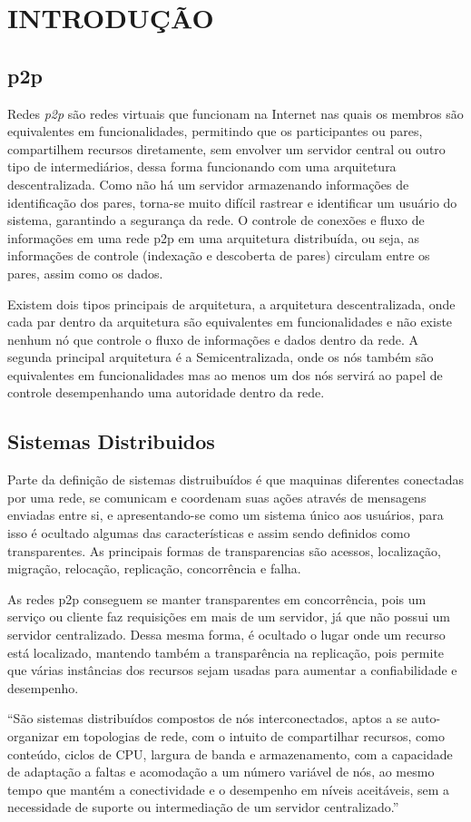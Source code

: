 \chapter{INTRODUÇÃO}
\label{cap:01}
\section{\ac{p2p}}
 
Redes \textit{\ac{p2p}}  são redes virtuais que funcionam na Internet nas quais os membros são equivalentes em funcionalidades, permitindo que os participantes ou pares, compartilhem recursos diretamente, sem envolver um servidor central ou outro tipo de intermediários, dessa forma funcionando com uma arquitetura descentralizada. Como não há um servidor armazenando informações de identificação dos pares, torna-se muito difícil rastrear e identificar um usuário do sistema, garantindo a segurança da rede. O controle de conexões e fluxo de informações em uma rede \ac{p2p} em uma arquitetura distribuída, ou seja, as informações de controle (indexação e descoberta de pares) circulam entre os pares, assim como os dados. \cite{p2p, rocha2004peer}

Existem dois tipos principais de arquitetura, a arquitetura descentralizada, onde cada par dentro da arquitetura são equivalentes em funcionalidades e não existe nenhum nó que controle o fluxo de informações e dados dentro da rede. A segunda principal arquitetura é a Semicentralizada, onde os nós também são equivalentes em funcionalidades mas ao menos um dos nós servirá  ao papel de controle desempenhando uma autoridade dentro da rede.\cite{inproceedings}


\section{Sistemas Distribuidos}
Parte da definição de sistemas distruibuídos é que maquinas diferentes conectadas por uma rede, se comunicam e coordenam suas ações através de mensagens enviadas entre si, e  apresentando-se como um sistema único aos usuários, para isso é ocultado algumas das características e assim sendo definidos como transparentes. As principais formas de transparencias são acessos, localização, migração, relocação, replicação, concorrência e falha. \cite{van2002distributed, coulourisdistributed}


As redes \ac{p2p} conseguem se manter transparentes em concorrência, pois um serviço ou cliente faz requisições em mais de um servidor, já que não possui um servidor centralizado. Dessa mesma forma, é ocultado o lugar onde um recurso está localizado, mantendo também a transparência na replicação, pois permite que várias instâncias dos recursos sejam usadas para aumentar a confiabilidade e desempenho. \cite{van2002distributed}
    
“São sistemas distribuídos compostos de nós interconectados, aptos a se auto-organizar em topologias de rede, com o intuito de compartilhar recursos, como conteúdo, ciclos de CPU, largura de banda e armazenamento, com a capacidade de adaptação a faltas e acomodação a um número variável de nós, ao mesmo tempo que mantém a conectividade e o desempenho em níveis aceitáveis, sem a necessidade de suporte ou intermediação de um servidor centralizado.” \cite{androutsellis2004survey}
